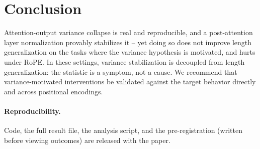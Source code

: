 \documentclass[11pt]{article}
\begin{document}
\section{Conclusion}
Attention-output variance collapse is real and reproducible, and a post-attention layer normalization
provably stabilizes it -- yet doing so does not improve length generalization on the tasks where the
variance hypothesis is motivated, and hurts under RoPE. In these settings, variance stabilization is
decoupled from length generalization: the statistic is a symptom, not a cause. We recommend that
variance-motivated interventions be validated against the target behavior directly and across positional
encodings.

\paragraph{Reproducibility.} Code, the full result file, the analysis script, and the pre-registration
(written before viewing outcomes) are released with the paper.



\end{document}
